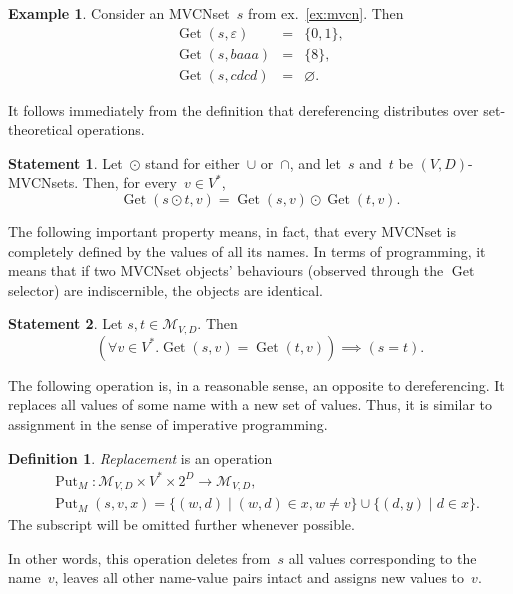 \documentclass{article}
\theoremstyle{definition}
\newtheorem{Df}{Definition}
\newtheorem{St}{Statement}
\newtheorem{Ex}{Example}
\newcommand{\setcharmvcn}{M}
\newcommand{\setsymbol}[3]{\mathcal{#1}_{#2,#3}}
\newcommand{\setmvcn}[2]{\setsymbol{\setcharmvcn}{#1}{#2}}
\newcommand{\deref}{\operatorname{Get}}
\newcommand{\putval}{\operatorname{Put}}
\begin{document}
\begin{Ex}\label{ex:mvcn-dereferencing}
Consider an MVCNset~$s$ from ex.~\ref{ex:mvcn}. Then
\begin{eqnarray*}
  \deref(s, \varepsilon) & = & \{ 0, 1 \}, \\
  \deref(s, baaa)        & = & \{ 8 \}, \\
  \deref(s, cdcd)        & = & \varnothing .
\end{eqnarray*}

\end{Ex}

It follows immediately from the definition that dereferencing distributes
over set-theore\-tical operations.
\begin{St}\label{st:mvcn-deref-distributivity}
Let~$\odot$ stand for either~$\cup$ or~$\cap$, and let~$s$ and~$t$ be
$(V,D)$-MVCNsets. Then, for every~$v\in V^\ast$,
\[
  \deref(s\odot t, v) = \deref(s, v) \odot \deref(t, v) .
\]
\end{St}

The following important property means, in fact, that every MVCNset is completely
defined by the values of all its names.  In terms of programming, it means that
if two MVCNset objects' behaviours (observed through the $\deref$ selector) are
indiscernible, the objects are identical.
\begin{St}\label{st:mvcn-deref-equality}
Let $s, t \in \setmvcn{V}{D}$. Then
\[
  (\forall v\in V^\ast . \deref(s,v) = \deref(t,v)) \implies (s = t) .
\]
\end{St}

The following operation is, in a reasonable sense, an opposite to
dereferencing.  It replaces all values of some name with a new set of values.
Thus, it is similar to assignment in the sense of imperative programming.
\begin{Df}\label{df:mvcn-replace}
\emph{Replacement} is an operation
\begin{eqnarray*}
 & \putval_\setcharmvcn :
    \setmvcn{V}{D} \times V^\ast \times 2^D \to \setmvcn{V}{D}, \\
 & \putval_\setcharmvcn(s, v, x) =
      \{ (w, d) \mid (w, d) \in x, w \neq v \} \cup
      \{ (d, y) \mid d \in x \} .
\end{eqnarray*}
The subscript will be omitted further whenever possible.
\end{Df}
In other words, this operation deletes from~$s$ all values corresponding to
the name~$v$, leaves all other name-value pairs intact and assigns new values
to~$v$.
\end{document}
